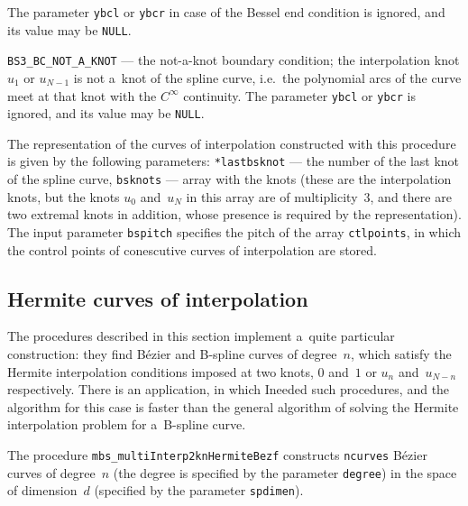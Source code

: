 \begin{mydescription}
    The parameter \texttt{ybcl} or \texttt{ybcr} in case of the Bessel end
    condition is ignored, and its value may be \texttt{NULL}.
  \item[]\texttt{BS3\_BC\_NOT\_A\_KNOT} --- the not-a-knot boundary condition;
    the interpolation knot $u_1$ or $u_{N-1}$ is not a~knot of the spline curve,
    i.e.\ the polynomial arcs of the curve meet at that knot with the
    $C^\infty$ continuity. The parameter \texttt{ybcl} or \texttt{ybcr}
    is ignored, and its value may be \texttt{NULL}.
\end{mydescription}

The representation of the curves of interpolation constructed with
this procedure is given by the following parameters: \texttt{*lastbsknot}
--- the number of the last knot of the spline curve, \texttt{bsknots} ---
array with the knots (these are the interpolation knots, but
the knots $u_0$ and~$u_N$ in this array are of multiplicity~$3$, and there
are two extremal knots in addition, whose presence is required by the
representation). The input parameter \texttt{bspitch}
specifies the pitch of the array \texttt{ctlpoints}, in which the control
points of conescutive curves of interpolation are stored.


\subsection{Hermite curves of interpolation}

The procedures described in this section implement a~quite particular
construction: they find B\'{e}zier and B-spline curves of degree~$n$,
which satisfy the Hermite interpolation conditions imposed at two knots,
$0$ and~$1$ or $u_n$ and~$u_{N-n}$ respectively. There is an application,
in which Ineeded such procedures, and the algorithm for this case is
faster than the general algorithm of solving the Hermite interpolation
problem for a~B-spline curve.

\vspace{\bigskipamount}
\begin{sloppypar}
The procedure \texttt{mbs\_multiInterp2knHermiteBezf} constructs \texttt{ncurves}
B\'{e}zier curves of degree~$n$ (the degree is specified by the parameter
\texttt{degree}) in the space of dimension~$d$ (specified by the parameter
\texttt{spdimen}).
\end{sloppypar}

